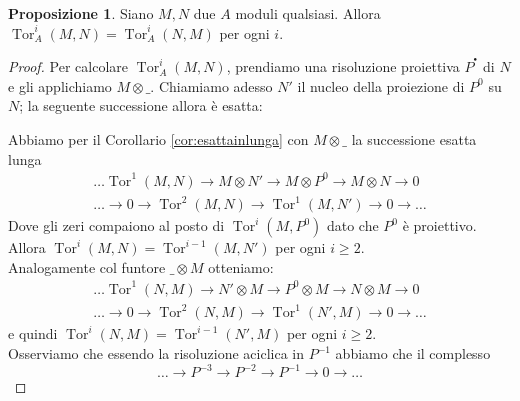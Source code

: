 \documentclass[a4paper,11pt,oneside]{book}
\newcommand{\complx}[1]{#1^{^\bullet}}
\DeclareMathOperator{\Tor}{Tor}
\theoremstyle{definition}
\newtheorem{prop}{Proposizione}
\begin{document}
 \begin{prop}
  Siano $M,N$ due $A$ moduli qualsiasi. Allora $\Tor_A^i(M,N)=\Tor_A^i(N,M)$ per ogni $i$.
 \end{prop}
 \begin{proof}
  Per calcolare $\Tor_A^i(M,N)$, prendiamo una risoluzione proiettiva $\complx{P}$ di $N$
  e gli applichiamo $M\otimes \_$. Chiamiamo adesso $N'$ il nucleo della proiezione di $P^0$ su $N$; la seguente successione allora \`e esatta:
  \begin{center}
      \end{center}
      Abbiamo per il Corollario \ref{cor:esattainlunga} con $M\otimes \_$ la successione esatta lunga
      \begin{equation}\label{eq:tor1}
	\begin{matrix}
	\dots\Tor^1(M,N)\rightarrow  M\otimes N' \rightarrow M \otimes P^0 \rightarrow M \otimes N \rightarrow 0\\
	\dots\rightarrow 0 \rightarrow \Tor^2 (M,N)\rightarrow \Tor^1(M,N') \rightarrow 0 \rightarrow  \dots
	\end{matrix}
      \end{equation}
      Dove gli zeri compaiono al posto di $\Tor^i(M,P^0)$ dato che $P^0$ \`e proiettivo. 
      Allora $\Tor^i(M,N) = \Tor^{i-1}(M,N')$ per ogni $i\geq 2$. \\
      Analogamente col funtore $\_\otimes M$ otteniamo:
      \begin{equation}\label{eq:tor2}
	\begin{matrix}
	\dots\Tor^1(N,M)\rightarrow  N'\otimes M  \rightarrow P^0 \otimes M \rightarrow N \otimes M\rightarrow 0\\
	\dots\rightarrow 0 \rightarrow \Tor^2 (N,M)\rightarrow \Tor^1(N',M) \rightarrow 0 \rightarrow  \dots
	\end{matrix}
      \end{equation}
      e quindi $\Tor^i(N,M) = \Tor^{i-1}(N',M)$ per ogni $i\geq 2$.\\
       Osserviamo che essendo la risoluzione aciclica in $P^{-1}$ abbiamo che il complesso
       \[
 	\dots\rightarrow P^{-3} \rightarrow P^{-2} \rightarrow P^{-1} \rightarrow 0\rightarrow \dots
\]
\end{proof}
\end{document}
